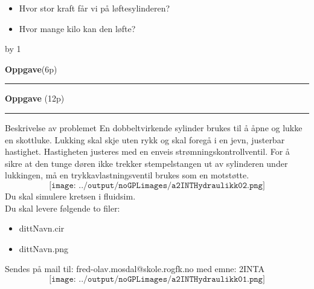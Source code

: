 \documentclass[12pt,a4paper]{article}
\def\oppgave{
            \advance\questnum by 1
	    \ifthenelse{\questnum>0\AND \questnum<9}
	    {
                \vskip 1cm
		\textbf{Oppgave}\hskip 5pt\the\questnum \hfill \hfill(6p)
		\vskip 3pt
		\hrule
	\vskip 0.5cm}
	{
                \vskip 1cm
		\textbf{Oppgave}\hskip 5pt \the\questnum \hfill \hfill(12p)
		\vskip 3pt \hrule \vskip 0.5cm }

		}
\begin{document}
\begin{itemize}
	\item Hvor stor kraft får vi på løftesylinderen?
	\item Hvor mange kilo kan den løfte? 
\end{itemize}
\vskip 5pt 
\vskip 2.5pt 
\newpage
\oppgave{}%
\vskip 1cm 
Beskrivelse av problemet En dobbeltvirkende sylinder brukes til å åpne og lukke en skottluke. Lukking skal skje uten rykk og skal foregå i en jevn, justerbar hastighet. Hastigheten justeres med en enveis strømningskontrollventil.
\vskip 1cm 
For å sikre at den tunge døren ikke trekker stempelstangen ut av sylinderen under lukkingen, må en trykkavlastningsventil brukes som en motstøtte.
\vskip 1cm 
$$\texttt{[image: ../output/noGPLimages/a2INTHydraulikk02.png]}$$
\vskip 1cm 
Du skal simulere kretsen i fluidsim. \\
Du skal levere følgende to filer:
\begin{itemize}
	\item dittNavn.cir %
	\item dittNavn.png %
\end{itemize}

Sendes på mail til: fred-olav.mosdal@skole.rogfk.no
med emne: 2INTA
\vskip 1cm 
$$\texttt{[image: ../output/noGPLimages/a2INTHydraulikk01.png]}$$
\vskip 5pt 
\vskip 2.5pt 
\end{document}
